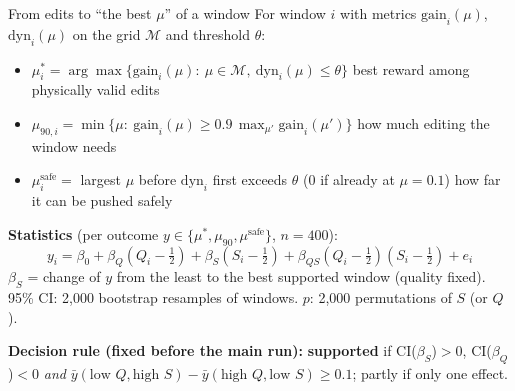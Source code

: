 \documentclass[aspectratio=169,11pt]{beamer}
\newcommand{\yes}{\textcolor{ok}{\textbf{supported}}}
\begin{document}
\begin{frame}{From edits to ``the best $\mu$'' of a window}
\small
For window $i$ with metrics $\text{gain}_i(\mu)$, $\text{dyn}_i(\mu)$ on the grid $\mathcal M$ and threshold $\theta$:
\begin{itemize}
\item $\mu^*_i=\arg\max\{\text{gain}_i(\mu):\ \mu\in\mathcal M,\ \text{dyn}_i(\mu)\le\theta\}$ \hfill best reward among physically valid edits
\item $\mu_{90,i}=\min\{\mu:\ \text{gain}_i(\mu)\ge0.9\,\max_{\mu'}\text{gain}_i(\mu')\}$ \hfill how much editing the window needs
\item $\mu^{\text{safe}}_i=$ largest $\mu$ before $\text{dyn}_i$ first exceeds $\theta$ (0 if already at $\mu=0.1$) \hfill how far it can be pushed safely
\end{itemize}
\textbf{Statistics} (per outcome $y\in\{\mu^*,\mu_{90},\mu^{\text{safe}}\}$, $n=400$):
\[
y_i=\beta_0+\beta_Q(Q_i-\tfrac12)+\beta_S(S_i-\tfrac12)+\beta_{QS}(Q_i-\tfrac12)(S_i-\tfrac12)+e_i
\]
$\beta_S$ = change of $y$ from the least to the best supported window (quality fixed). 95\% CI: 2{,}000 bootstrap resamples of windows. $p$: 2{,}000 permutations of $S$ (or $Q$).
\vspace{0.3em}

\textbf{Decision rule (fixed before the main run):} \yes{} if CI($\beta_S$)$>0$, CI($\beta_Q$)$<0$ \emph{and} $\bar y(\text{low }Q,\text{high }S)-\bar y(\text{high }Q,\text{low }S)\ge0.1$; partly if only one effect.
\end{frame}

\end{document}
